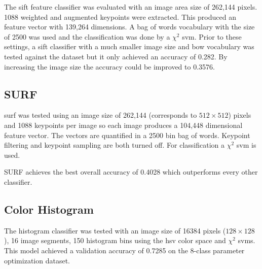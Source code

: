 The \gls{sift} feature classifier was evaluated with an image area size of 262,144 pixels. 1088 weighted and augmented keypoints were extracted. This produced an feature vector with 139,264 dimensions. A bag of words vocabulary with the size of 2500 was used and the classification was done by a $\chi^2$ \gls{svm}. Prior to these settings, a \gls{sift} classifier with a much smaller image size and bow vocabulary was tested against the dataset but it only achieved an accuracy of 0.282. By increasing the image size the accuracy could be improved to 0.3576.

\subsection{SURF}

\gls{surf} was tested using an image size of 262,144 {(corresponds to $512 \times 512$)} pixels and 1088 keypoints per image so each image produces a 104,448 dimensional feature vector. The vectors are quantified in a 2500 bin bag of words. Keypoint filtering and keypoint sampling are both turned off. For classification a $\chi^2$ \gls{svm} is used.

SURF achieves the best overall accuracy of 0.4028 which outperforms every other classifier. 

\subsection{Color Histogram}
The histogram classifier was tested with an image size of 16384 pixels {($128 \times 128$)}, 16 image segments, 150 histogram bins using the \gls{hsv} color space and $\chi^2$ \glspl{svm}. This model achieved a validation accuracy of 0.7285 on the 8-class parameter optimization dataset. 

